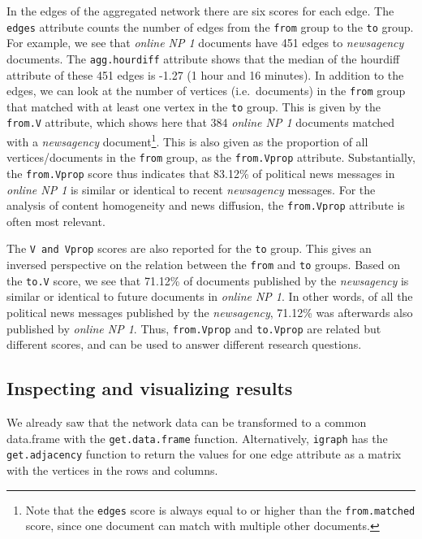 \documentclass[]{article}
\let\rmarkdownfootnote\footnote%
\def\footnote{\protect\rmarkdownfootnote}
\begin{document}
In the edges of the aggregated network there are six scores for each
edge. The \texttt{edges} attribute counts the number of edges from the
\texttt{from} group to the \texttt{to} group. For example, we see that
\emph{online NP 1} documents have 451 edges to \emph{newsagency}
documents. The \texttt{agg.hourdiff} attribute shows that the median of
the hourdiff attribute of these 451 edges is -1.27 (1 hour and 16
minutes). In addition to the edges, we can look at the number of
vertices (i.e.~documents) in the \texttt{from} group that matched with
at least one vertex in the \texttt{to} group. This is given by the
\texttt{from.V} attribute, which shows here that 384 \emph{online NP 1}
documents matched with a \emph{newsagency} document\footnote{Note that
  the \texttt{edges} score is always equal to or higher than the
  \texttt{from.matched} score, since one document can match with
  multiple other documents.}. This is also given as the proportion of
all vertices/documents in the \texttt{from} group, as the
\texttt{from.Vprop} attribute. Substantially, the \texttt{from.Vprop}
score thus indicates that 83.12\% of political news messages in
\emph{online NP 1} is similar or identical to recent \emph{newsagency}
messages. For the analysis of content homogeneity and news diffusion,
the \texttt{from.Vprop} attribute is often most relevant.

The \texttt{V\textquotesingle{} and \textquotesingle{}Vprop} scores are
also reported for the \texttt{to} group. This gives an inversed
perspective on the relation between the \texttt{from} and \texttt{to}
groups. Based on the \texttt{to.V} score, we see that 71.12\% of
documents published by the \emph{newsagency} is similar or identical to
future documents in \emph{online NP 1}. In other words, of all the
political news messages published by the \emph{newsagency}, 71.12\% was
afterwards also published by \emph{online NP 1}. Thus,
\texttt{from.Vprop} and \texttt{to.Vprop} are related but different
scores, and can be used to answer different research questions.

\subsection{Inspecting and visualizing
results}\label{inspecting-and-visualizing-results}

We already saw that the network data can be transformed to a common
data.frame with the \texttt{get.data.frame} function. Alternatively,
\texttt{igraph} has the \texttt{get.adjacency} function to return the
values for one edge attribute as a matrix with the vertices in the rows
and columns.
\end{document}
